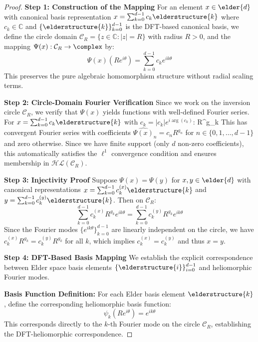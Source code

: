 \begin{proof}
\textbf{Step 1: Construction of the Mapping}
For an element $x \in \elder{d}$ with canonical basis representation $x = \sum_{k=0}^{d-1} c_k \elderstructure{k}$ where $c_k \in \mathbb{C}$ and $\{\elderstructure{k}\}_{k=0}^{d-1}$ is the DFT-based canonical basis, we define the circle domain $\mathcal{C}_R = \{z \in \mathbb{C} : |z| = R\}$ with radius $R > 0$, and the mapping $\Psi(x): \mathcal{C}_R \rightarrow \complex$ by:
\begin{equation}
\Psi(x)(Re^{i\theta}) = \sum_{k=0}^{d-1} c_k e^{ik\theta}
\end{equation}
This preserves the pure algebraic homomorphism structure without radial scaling terms.

\textbf{Step 2: Circle-Domain Fourier Verification}
Since we work on the inversion circle $\mathcal{C}_R$, we verify that $\Psi(x)$ yields functions with well-defined Fourier series. For $x = \sum_{k=0}^{d-1} c_k \elderstructure{k}$ with $c_k = |c_k|e^{i\arg(c_k)}$:
\text{[Note: Earlier inconsistent equation with} R^{g_k} \text{terms removed. Step 3 below shows corrected equation.]}
This has convergent Fourier series with coefficients $\hat{\Psi(x)}_n = c_n R^{g_n}$ for $n \in \{0,1,\ldots,d-1\}$ and zero otherwise. Since we have finite support (only $d$ non-zero coefficients), this automatically satisfies the $\ell^1$ convergence condition and ensures membership in $\mathcal{HL}(\mathcal{C}_R)$.

\textbf{Step 3: Injectivity Proof}
Suppose $\Psi(x) = \Psi(y)$ for $x, y \in \elder{d}$ with canonical representations $x = \sum_{k=0}^{d-1} c_k^{(x)} \elderstructure{k}$ and $y = \sum_{k=0}^{d-1} c_k^{(y)} \elderstructure{k}$. Then on $\mathcal{C}_R$:
$$\sum_{k=0}^{d-1} c_k^{(x)} R^{g_k} e^{ik\theta} = \sum_{k=0}^{d-1} c_k^{(y)} R^{g_k} e^{ik\theta}$$
Since the Fourier modes $\{e^{ik\theta}\}_{k=0}^{d-1}$ are linearly independent on the circle, we have $c_k^{(x)} R^{g_k} = c_k^{(y)} R^{g_k}$ for all $k$, which implies $c_k^{(x)} = c_k^{(y)}$ and thus $x = y$.

\textbf{Step 4: DFT-Based Basis Mapping}
We establish the explicit correspondence between Elder space basis elements $\{\elderstructure{i}\}_{i=0}^{d-1}$ and heliomorphic Fourier modes.

\textbf{Basis Function Definition:} For each Elder basis element $\elderstructure{k}$, define the corresponding heliomorphic basis function:
$$\psi_k(Re^{i\theta}) = e^{ik\theta}$$
This corresponds directly to the $k$-th Fourier mode on the circle $\mathcal{C}_R$, establishing the DFT-heliomorphic correspondence.


\end{proof}
